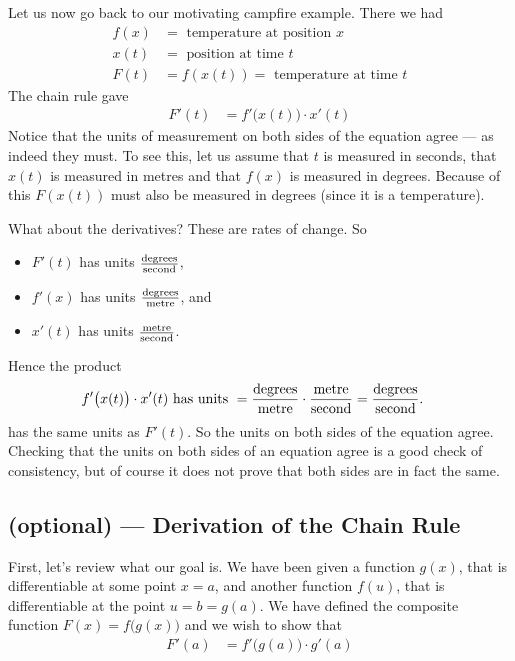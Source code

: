 \begin{eg}
\label{eg:DIFFcampfireB}
Let us now go back to our motivating campfire example. There we had
\begin{align*}
  f(x) &= \text{ temperature at position $x$} \\
  x(t) &= \text{ position at time $t$} \\
  F(t) &= f(x(t)) = \text{ temperature at time $t$}
\end{align*}
The chain rule gave
\begin{align*}
  F'(t) &= f'\big(x(t)\big) \cdot x'(t)
\end{align*}
Notice that the units of measurement on both sides of the equation agree
--- as indeed they must. To see this, let us assume that $t$ is measured
in seconds, that $x(t)$ is measured in metres and that $f(x)$ is measured in
degrees. Because of this $F(x(t))$ must also be measured in degrees (since it is
a temperature).

What about the derivatives? These are rates of change. So
\begin{itemize}
 \item $F'(t)$ has units $\frac{\rm degrees}{\rm second}$,
 \item $f'(x)$ has units $\frac{\rm degrees}{\rm metre}$, and
 \item $x'(t)$ has units $\frac{\rm metre}{\rm second}$.
\end{itemize}
Hence the product
\begin{align*}
  f'\big(x(t)\big) \cdot x'(t) &
   \text{ has units } = \frac{\rm degrees}{\rm metre} \cdot
                              \frac{\rm metre}{\rm second}
   = \frac{\rm degrees}{\rm second}.
\end{align*}
has the same units as $F'(t)$.
So the units on both sides of the equation agree. Checking
that the units on both sides of an equation agree is a good
check of consistency, but of course it does not prove that both sides
are in fact the same.
\end{eg}


\subsection*{(optional) --- Derivation of the Chain Rule}

First, let's review what our goal is. We have been given a function
$g(x)$, that is differentiable at some point $x=a$, and another function
$f(u)$, that is differentiable at the point $u=b = g(a)$. We have defined
the composite function $F(x) = f\big(g(x)\big)$ and we wish to show that
\begin{align*}
  F'(a) &= f'\big(g(a)\big) \cdot g'(a)
\end{align*}


